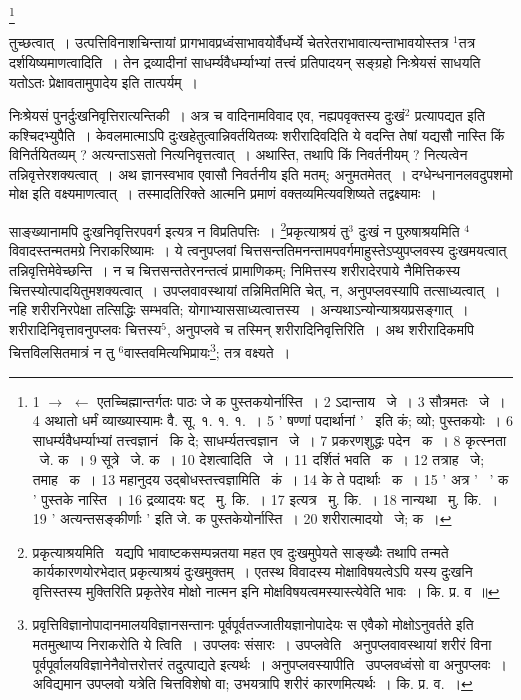 \documentclass[11pt, openany]{book}
\newcommand\blfootnote[1]{%
 \begingroup
 \renewcommand\thefootnote{}\footnote{#1}%
 \addtocounter{footnote}{-1}%
 \endgroup
}
\begin{document}
\blfootnote{1 $\rightarrow$ $\leftarrow$ एतच्चिह्मान्तर्गतः पाठः जे क पुस्तकयोर्नास्ति~। 2 ऽदान्ताय \textendash\ जे~। 3 सौत्रमतः  \textendash\ जे~। 4 अथातो धर्मं व्याख्यास्यामः वै. सू. १. १. १.~। 5 ' षण्णां पदार्थानां ' \textendash\ इति कं; व्यो; पुस्तकयोः~। 6 साधर्म्यवैधर्म्याभ्यां तत्त्वज्ञानं  \textendash\ कि दे; साधर्म्यतत्त्वज्ञान  \textendash\ जे~। 7 प्रकरणशुद्धः पदेन  \textendash\ क~। 8 कृत्स्नता  \textendash\ जे. क~। 9 सूत्रे  \textendash\ जे. क~। 10 देशत्वादिति  \textendash\ जे~। 11 दर्शितं भवति  \textendash\ क~। 12 तत्राह  \textendash\ जे; तमाह  \textendash\ क~। 13 महानुदय उद्बोधस्तत्त्वज्ञामिति  \textendash\ कं~। 14 के ते पदार्थाः  \textendash\ क~। 15 ' अत्र ' \textendash\ ' क ' पुस्तके नास्ति~। 16 द्रव्यादयः षट्  \textendash\ मु. कि.~। 17 इत्यत्र  \textendash\ मु. कि.~। 18 नान्यथा \textendash\ मु. कि.~। 19 ' अत्यन्तसङ्कीर्णाः ' इति जे. क पुस्तकेयोर्नास्ति~। 20 शरीरात्मादयो  \textendash\ जे; क~।}

\newpage
\noindent
तुच्छत्वात्~। उत्पत्तिविनाशचिन्तायां प्रागभावप्रध्वंसाभावयोर्वैधर्म्ये चेतरेतराभावात्यन्ताभावयोस्तत्र ${}^1$तत्र दर्शयिष्यमाणत्वादिति~। तेन द्रव्यादीनां साधर्म्यवैधर्म्याभ्यां तत्त्वं प्रतिपादयन् सङ्ग्रहो निःश्रेयसं साधयति यतोऽतः प्रेक्षावतामुपादेय इति तात्पर्यम्~।

निःश्रेयसं पुनर्दुःखनिवृत्तिरात्यन्तिकी~। अत्र च वादिनामविवाद एव, नह्यपवृक्तस्य दुःखं$^2$ प्रत्यापद्यत इति कश्चिदभ्युपैति~। केवलमात्माऽपि दुःखहेतुत्वान्निवर्तयितव्यः शरीरादिवदिति ये वदन्ति तेषां यद्यसौ नास्ति किं विनिर्तयितव्यम् ? अत्यन्ताऽसतो नित्यनिवृत्तत्वात्~। अथास्ति, तथापि किं निवर्तनीयम् ? नित्यत्वेन तन्निवृत्तेरशक्यत्वात्~। अथ ज्ञानस्वभाव एवासौ निवर्तनीय इति मतम्; अनुमतमेतत्~। दग्धेन्धनानलवदुपशमो मोक्ष इति वक्ष्यमाणत्वात्~। तस्मादतिरिक्ते आत्मनि प्रमाणं वक्तव्यमित्यवशिष्यते तद्वक्ष्यामः~।

{\knu साङ्ख्याना}मपि दुःखनिवृत्तिरपवर्ग इत्यत्र न विप्रतिपत्तिः~। \renewcommand{\thefootnote}{१}\footnote{प्रकृत्याश्रयमिति \textendash\ यद्यपि भावाष्टकसम्पन्नतया महत एव दुःखमुपेयते साङ्ख्यैः तथापि तन्मते कार्यकारणयोरभेदात् प्रकृत्याश्रयं दुःखमुक्तम्~। एतस्थ विवादस्य मोक्षाविषयत्वेऽपि यस्य दुःखनि वृत्तिस्तस्य मुक्तिरिति प्रकृतेरेव मोक्षो नात्मन इनि मोक्षविषयत्वमस्यास्त्येवेति भावः~। कि. प्र. व~॥}प्रकृत्याश्रयं तु$^3$ दुःखं न पुरुषाश्रयमिति ${}^4$विवादस्तन्मतमग्रे निराकरिष्यामः~। ये त्वनुपप्लवां चित्तसन्ततिमनन्तामपवर्गमाहुस्तेऽप्युपप्लवस्य दुःखमयत्वात् तन्निवृत्तिमेवेच्छन्ति~। न च चित्तसन्ततेरनन्तत्वं प्रामाणिकम्; निमित्तस्य शरीरादेरपाये नैमित्तिकस्य चित्तस्योत्पादयितुमशक्यत्वात्~। उपप्लवावस्थायां तन्निमितमिति चेत्, न, अनुपप्लवस्यापि तत्साध्यत्वात्~। नहि शरीरनिरपेक्षा तत्सिद्धिः सम्भवति; योगाभ्याससाध्यत्वात्तस्य~। अन्यथाऽन्योन्याश्रयप्रसङ्गात्~। शरीरादिनिवृत्तावनुपप्लवः चित्तस्य$^5$, अनुपप्लवे च तस्मिन् शरीरादिनिवृत्तिरिति~। अथ शरीरादिकमपि चित्तविलसितमात्रं न तु ${}^6$वास्तवमित्यभिप्रायः\renewcommand{\thefootnote}{२}\footnote{प्रवृत्तिविज्ञानोपादानमालयविज्ञानसन्तानः पूर्वपूर्वतज्जातीयज्ञानोपादेयः स एवैको मोक्षोऽनुवर्तते इति मतमुत्थाप्य निराकरोति ये त्विति~। उपप्लवः संसारः~। उपप्लवेति \textendash\ अनुपप्लवावस्थायां शरीरं विना पूर्वपूर्वालयविज्ञानेनैवोत्तरोत्तरं तदुत्पाद्यते इत्यर्थः~। अनुपप्लवस्यापीति \textendash\ उपप्लवध्वंसो वा अनुपप्लवः~। अविद्यमान उपप्लवो यत्रेति चित्तविशेषो वा; उभयत्रापि शरीरं कारणमित्यर्थः~। कि. प्र. व.~।}; तत्र वक्ष्यते~।
\end{document}
